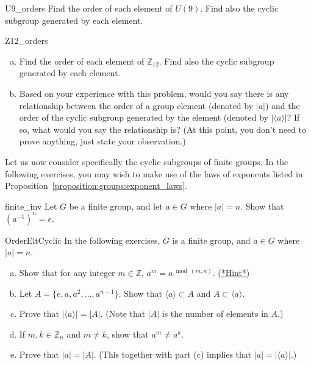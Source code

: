 \begin{exercise}{U9_orders}
Find the order of each element of $U(9)$. Find also the cyclic subgroup generated by each element.
\end{exercise}

\begin{exercise}{Z12_orders}
\begin{enumerate}[(a)]
\item
Find the order of each element of $\mathbb{Z}_{12}$. Find also the cyclic subgroup generated by each element.
\item
Based on your experience with this problem, would you say there is any relationship between the order of a group element (denoted by $|a|$) and the order of the cyclic subgroup generated by the element (denoted by $|\langle a \rangle |$? If so, what would you say the relationship is?  (At this point, you don't need to prove anything, just state your observation.)
\end{enumerate}
\end{exercise}


Let us now consider specifically the cyclic subgroups of finite groups. In the following exercises, you may wish to make use of 
the laws of exponents listed in Proposition~\ref{proposition:groups:exponent_laws}.

\begin{exercise}{finite_inv}
Let $G$ be a finite group, and let $a \in G$ where $|a|=n$. Show that $(a^{-1})^n = e$.
\end{exercise}

\begin{exercise}{OrderEltCyclic}
In the following exercises, $G$ is a finite group, and  $a \in G$ where $|a|=n$. 
\begin{enumerate}[(a)]
\item
Show that for any integer $m \in \mathbb{Z}$, $a^m = a^{\bmod(m,n)}$.
\hyperref[sec:groups:hints]{(*Hint*)} 
\item
Let $A = \{e,a,a^2,\ldots,a^{n-1}\}$.  Show that $\langle a \rangle \subset A$ and $A \subset \langle a \rangle$.
\item 
Prove that $| \langle a \rangle | = |A|$. (Note that $|A|$ is the number of elements in $A$.)
\item
If $m,k \in \mathbb{Z}_n$ and $m \ne k$, show that $a^m \ne a^k$.
\item
Prove that $|a| =|A|$.  (This together with part (c) implies that $|a| =  | \langle a \rangle |$.)
\end{enumerate}
\end{exercise}

